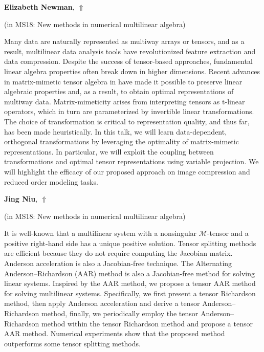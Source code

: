 \documentclass[ILAS2025-program.tex]{subfiles}
\begin{document}
\hypertarget{down0039}{}\begin{ilasabstract}
    
\textbf{Elizabeth Newman},  \hfill \hyperlink{up0039}{$\Uparrow$}
    
    
(in {\color{mstitle}MS18: New methods in numerical multilinear algebra})
        
\mtskip
    Many data are naturally represented as multiway arrays or tensors, and as a result, multilinear data analysis tools have revolutionized feature extraction and data compression. Despite the success of tensor-based approaches, fundamental linear algebra properties often break down in higher dimensions. Recent advances in matrix-mimetic tensor algebra in have made it possible to preserve linear algebraic properties and, as a result, to obtain optimal representations of multiway data. Matrix-mimeticity arises from interpreting tensors as t-linear operators, which in turn are parameterized by invertible linear transformations. The choice of transformation is critical to representation quality, and thus far, has been made heuristically. In this talk, we will learn data-dependent, orthogonal transformations by leveraging the optimality of matrix-mimetic representations. In particular, we will exploit the coupling between transformations and optimal tensor representations using variable projection. We will highlight the efficacy of our proposed approach on image compression and reduced order modeling tasks.

\end{ilasabstract}
    

\hypertarget{down0148}{}\begin{ilasabstract}
    
\textbf{Jing Niu},  \hfill \hyperlink{up0148}{$\Uparrow$}
    
    
(in {\color{mstitle}MS18: New methods in numerical multilinear algebra})
        
\mtskip
    It is well-known that a multilinear system with a nonsingular $ \mathcal{M} $-tensor and a positive right-hand side has a unique positive solution.
Tensor splitting methods are efficient because they do not require computing the Jacobian matrix.
Anderson acceleration is also a Jacobian-free technique. 
The Alternating Anderson--Richardson (AAR) method is also a Jacobian-free method for solving linear systems.
Inspired by the AAR method,
we propose a tensor AAR method for solving multilinear systems.
Specifically, we first present a tensor Richardson method, then apply Anderson acceleration and derive a tensor Anderson--Richardson method, finally, we periodically employ the tensor Anderson--Richardson method within the tensor Richardson method and propose a tensor AAR method.
Numerical experiments show that the proposed method outperforms some tensor splitting methods.

\end{ilasabstract}
    
\end{document}
